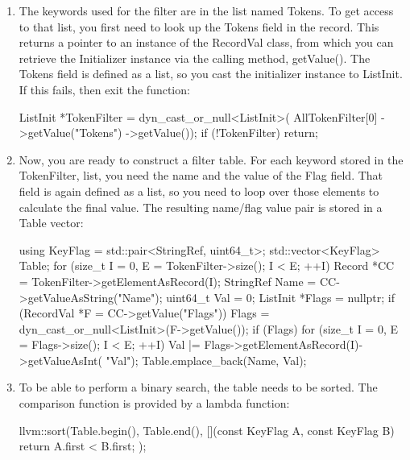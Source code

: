 \begin{enumerate}
\item
The keywords used for the filter are in the list named Tokens. To get access to that list, you first need to look up the Tokens field in the record. This returns a pointer to an instance of the RecordVal class, from which you can retrieve the Initializer instance via the calling method, getValue(). The Tokens field is defined as a list, so you cast the initializer instance to ListInit. If this fails, then exit the function:

\begin{cpp}
    ListInit *TokenFilter = dyn_cast_or_null<ListInit>(
        AllTokenFilter[0]
            ->getValue("Tokens")
            ->getValue());
    if (!TokenFilter)
        return;
\end{cpp}

\item
Now, you are ready to construct a filter table. For each keyword stored in the TokenFilter, list, you need the name and the value of the Flag field. That field is again defined as a list, so you need to loop over those elements to calculate the final value. The resulting name/flag value pair is stored in a Table vector:

\begin{cpp}
    using KeyFlag = std::pair<StringRef, uint64_t>;
    std::vector<KeyFlag> Table;
    for (size_t I = 0, E = TokenFilter->size(); I < E;
            ++I) {
        Record *CC = TokenFilter->getElementAsRecord(I);
        StringRef Name = CC->getValueAsString("Name");
        uint64_t Val = 0;
        ListInit *Flags = nullptr;
        if (RecordVal *F = CC->getValue("Flags"))
            Flags = dyn_cast_or_null<ListInit>(F->getValue());
        if (Flags) {
            for (size_t I = 0, E = Flags->size(); I < E; ++I) {
                Val |=
                Flags->getElementAsRecord(I)->getValueAsInt(
                "Val");
            }
        }
        Table.emplace_back(Name, Val);
    }
\end{cpp}

\item
To be able to perform a binary search, the table needs to be sorted. The comparison function is provided by a lambda function:

\begin{cpp}
    llvm::sort(Table.begin(), Table.end(),
                [](const KeyFlag A, const KeyFlag B) {
                    return A.first < B.first;
                });
\end{cpp}


\end{enumerate}

